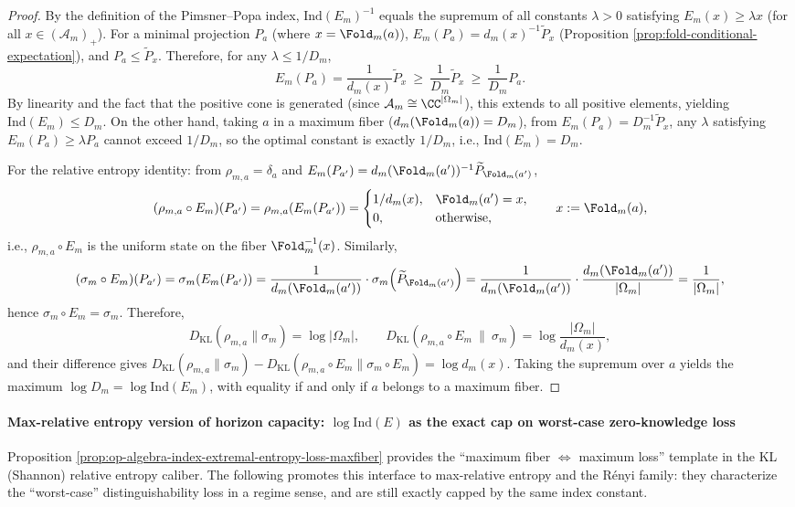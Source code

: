 \begin{proof}
By the definition of the Pimsner--Popa index, \(\mathrm{Ind}(E_m)^{-1}\) equals the supremum of all constants \(\lambda>0\) satisfying
\(
E_m(x)\ge \lambda x
\) (for all \(x\in(\mathcal{A}_m)_+\)).
For a minimal projection \(P_a\) (where \(x=\Fold_m(a)\)),
\(
E_m(P_a)=d_m(x)^{-1}\widetilde P_x
\)
(Proposition \ref{prop:fold-conditional-expectation}), and \(P_a\le \widetilde P_x\).
Therefore, for any \(\lambda\le 1/D_m\),
\[
E_m(P_a)=\frac{1}{d_m(x)}\widetilde P_x\ \ge\ \frac{1}{D_m}\widetilde P_x\ \ge\ \frac{1}{D_m}P_a.
\]
By linearity and the fact that the positive cone is generated (since \(\mathcal{A}_m\cong \CC^{|\Omega_m|}\)), this extends to all positive elements, yielding \(\mathrm{Ind}(E_m)\le D_m\).
On the other hand, taking \(a\) in a maximum fiber (\(d_m(\Fold_m(a))=D_m\)), from
\(
E_m(P_a)=D_m^{-1}\widetilde P_x
\),
any \(\lambda\) satisfying \(E_m(P_a)\ge \lambda P_a\) cannot exceed \(1/D_m\), so the optimal constant is exactly \(1/D_m\), i.e., \(\mathrm{Ind}(E_m)=D_m\).
\par
For the relative entropy identity: from \(\rho_{m,a}=\delta_a\) and \(E_m(P_{a'})=d_m(\Fold_m(a'))^{-1}\widetilde P_{\Fold_m(a')}\),
\[
(\rho_{m,a}\circ E_m)(P_{a'})
=\rho_{m,a}\!\left(E_m(P_{a'})\right)
=\begin{cases}
1/d_m(x),& \Fold_m(a')=x,\\
0,& \text{otherwise},
\end{cases}
\qquad x:=\Fold_m(a),
\]
i.e., \(\rho_{m,a}\circ E_m\) is the uniform state on the fiber \( \Fold_m^{-1}(x)\).
Similarly,
\[
(\sigma_m\circ E_m)(P_{a'})
=\sigma_m\!\left(E_m(P_{a'})\right)
=\frac{1}{d_m(\Fold_m(a'))}\cdot \sigma_m\!\left(\widetilde P_{\Fold_m(a')}\right)
=\frac{1}{d_m(\Fold_m(a'))}\cdot \frac{d_m(\Fold_m(a'))}{|\Omega_m|}
=\frac{1}{|\Omega_m|},
\]
hence \(\sigma_m\circ E_m=\sigma_m\).
Therefore,
\[
D_{\mathrm{KL}}(\rho_{m,a}\|\sigma_m)=\log|\Omega_m|,
\qquad
D_{\mathrm{KL}}(\rho_{m,a}\circ E_m\ \|\ \sigma_m)=\log\frac{|\Omega_m|}{d_m(x)},
\]
and their difference gives
\(
D_{\mathrm{KL}}(\rho_{m,a}\|\sigma_m)-D_{\mathrm{KL}}(\rho_{m,a}\circ E_m\|\sigma_m\circ E_m)=\log d_m(x)
\).
Taking the supremum over \(a\) yields the maximum \(\log D_m=\log\mathrm{Ind}(E_m)\), with equality if and only if \(a\) belongs to a maximum fiber. \qedhere
\end{proof}

\paragraph{Max-relative entropy version of horizon capacity: \texorpdfstring{$\log\mathrm{Ind}(E)$}{log Ind(E)} as the exact cap on worst-case zero-knowledge loss}
Proposition \ref{prop:op-algebra-index-extremal-entropy-loss-maxfiber} provides the ``maximum fiber \(\Longleftrightarrow\) maximum loss'' template in the KL (Shannon) relative entropy caliber.
The following promotes this interface to max-relative entropy and the R\'enyi family: they characterize the ``worst-case'' distinguishability loss in a regime sense, and are still exactly capped by the same index constant.

